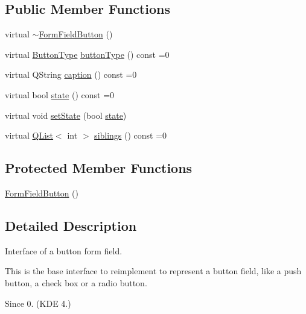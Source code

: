 \subsection*{Public Member Functions}
\begin{DoxyCompactItemize}
\item 
virtual \hyperlink{classOkular_1_1FormFieldButton_ab3e7e155de74b9658d625959751357be}{$\sim$\+Form\+Field\+Button} ()
\item 
virtual \hyperlink{classOkular_1_1FormFieldButton_a4b03fd77132be17273c8f4ebbd247186}{Button\+Type} \hyperlink{classOkular_1_1FormFieldButton_ad788d8b6383fa96173a4876292d1f18e}{button\+Type} () const =0
\item 
virtual Q\+String \hyperlink{classOkular_1_1FormFieldButton_a73098d0def0b5f92cd7efbfb7e273c00}{caption} () const =0
\item 
virtual bool \hyperlink{classOkular_1_1FormFieldButton_aff17cce65de36b508a3a645747e24c51}{state} () const =0
\item 
virtual void \hyperlink{classOkular_1_1FormFieldButton_a8eabbc4f91bcbec292a07206bbbb2b6e}{set\+State} (bool \hyperlink{classOkular_1_1FormFieldButton_aff17cce65de36b508a3a645747e24c51}{state})
\item 
virtual \hyperlink{classQList}{Q\+List}$<$ int $>$ \hyperlink{classOkular_1_1FormFieldButton_a952fa128da5499ce3884c7774bed215b}{siblings} () const =0
\end{DoxyCompactItemize}
\subsection*{Protected Member Functions}
\begin{DoxyCompactItemize}
\item 
\hyperlink{classOkular_1_1FormFieldButton_ab96567504a8b95be989915f577ce6b3c}{Form\+Field\+Button} ()
\end{DoxyCompactItemize}


\subsection{Detailed Description}
Interface of a button form field. 

This is the base interface to reimplement to represent a button field, like a push button, a check box or a radio button.

\begin{DoxySince}{Since}
0. (K\+D\+E 4.) 
\end{DoxySince}


